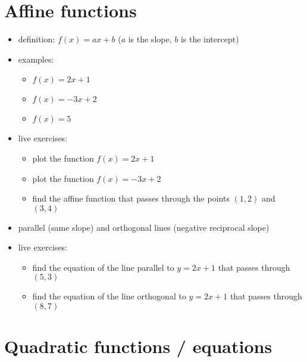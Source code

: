 \hypertarget{affine-functions}{%
\section{Affine functions}\label{affine-functions}}

\begin{itemize}
\tightlist
\item
  definition: \(f(x) = ax+b\) (\(a\) is the slope, \(b\) is the
  intercept)
\item
  examples:

  \begin{itemize}
  \tightlist
  \item
    \(f(x) = 2x+1\)
  \item
    \(f(x) = -3x+2\)
  \item
    \(f(x) = 5\)
  \end{itemize}
\item
  live exercises:

  \begin{itemize}
  \tightlist
  \item
    plot the function \(f(x) = 2x+1\)
  \item
    plot the function \(f(x) = -3x+2\)
  \item
    find the affine function that passes through the points \((1,2)\)
    and \((3,4)\)
  \end{itemize}
\item
  parallel (same slope) and orthogonal lines (negative reciprocal slope)
\item
  live exercises:

  \begin{itemize}
  \tightlist
  \item
    find the equation of the line parallel to \(y=2x+1\) that passes
    through \((5,3)\)
  \item
    find the equation of the line orthogonal to \(y=2x+1\) that passes
    through \((8,7)\)
  \end{itemize}
\end{itemize}

\hypertarget{quadratic-functions--equations}{%
\section{Quadratic functions /
equations}\label{quadratic-functions--equations}}


